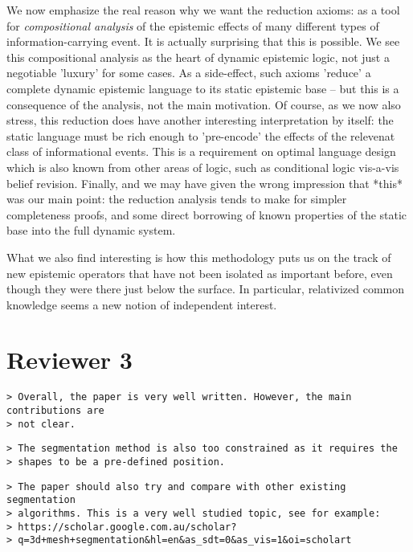 \documentclass{article}
\begin{document}
We now emphasize the real reason why we want the reduction axioms:
as a tool for {\em compositional analysis} of the epistemic effects of
many different types of information-carrying event. It is actually
surprising that this is possible. We see this compositional analysis
as the heart of dynamic epistemic logic, not just a negotiable
'luxury' for some cases. As a side-effect, such axioms
'reduce' a complete dynamic epistemic language to its static
epistemic base -- but this is a consequence of the analysis,
not the main motivation. Of course, as we now also stress, this
reduction does have another interesting interpretation by itself:
the static language must be rich enough to 'pre-encode' the
effects of the relevenat class of informational events. This
is a requirement on optimal language design which is also known
from other areas of logic, such as conditional logic vis-a-vis
belief revision. Finally, and we may have given the wrong
impression that *this* was our main point: the reduction
analysis tends to make for simpler completeness proofs,
and some direct borrowing of known properties of the
static base into the full dynamic system.

What we also find interesting is how this methodology puts us on
the track of new epistemic operators that have not been isolated
as important before, even though they were there just below the
surface. In particular, relativized common knowledge seems a
new notion of independent interest.

\section*{Reviewer 3}
\begin{verbatim}
> Overall, the paper is very well written. However, the main contributions are
> not clear.
\end{verbatim}

\begin{verbatim}
> The segmentation method is also too constrained as it requires the
> shapes to be a pre-defined position.
\end{verbatim}

\begin{verbatim}
> The paper should also try and compare with other existing segmentation
> algorithms. This is a very well studied topic, see for example:
> https://scholar.google.com.au/scholar?
> q=3d+mesh+segmentation&hl=en&as_sdt=0&as_vis=1&oi=scholart
\end{verbatim}
\end{document}
